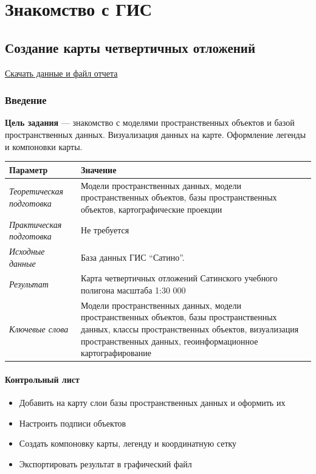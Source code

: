 \documentclass[12pt,]{book}
\providecommand{\tightlist}{%
  \setlength{\itemsep}{0pt}\setlength{\parskip}{0pt}}
\begin{document}
\hypertarget{part---}{%
\part{Знакомство с ГИС}\label{part---}}

\hypertarget{map-design-quaternary}{%
\chapter{Создание карты четвертичных отложений}\label{map-design-quaternary}}

\href{http://autolab.geogr.msu.ru/gis/data/Ex01.zip}{Скачать данные и файл отчета}

\hypertarget{map-design-quaternary-intro}{%
\section{Введение}\label{map-design-quaternary-intro}}

\textbf{Цель задания} --- знакомство с моделями пространственных объектов и базой пространственных данных. Визуализация данных на карте. Оформление легенды и компоновки карты.

\begin{longtable}[]{@{}ll@{}}
\toprule
Параметр & Значение\tabularnewline
\midrule
\endhead
\emph{Теоретическая подготовка} & Модели пространственных данных, модели пространственных объектов, базы пространственных объектов, картографические проекции\tabularnewline
\emph{Практическая подготовка} & Не требуется\tabularnewline
\emph{Исходные данные} & База данных ГИС ``Сатино''.\tabularnewline
\emph{Результат} & Карта четвертичных отложений Сатинского учебного полигона масштаба 1:30 000\tabularnewline
\emph{Ключевые слова} & Модели пространственных данных, модели пространственных объектов, базы пространственных данных, классы пространственных объектов, визуализация пространственных данных, геоинформационное картографирование\tabularnewline
\bottomrule
\end{longtable}

\hypertarget{map-design-quaternary-control}{%
\subsection{Контрольный лист}\label{map-design-quaternary-control}}

\begin{itemize}
\tightlist
\item
  Добавить на карту слои базы пространственных данных и оформить их
\item
  Настроить подписи объектов
\item
  Создать компоновку карты, легенду и координатную сетку
\item
  Экспортировать результат в графический файл
\end{itemize}
\end{document}
